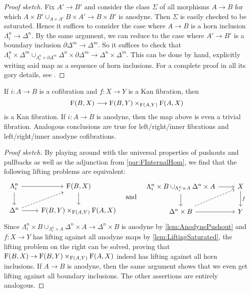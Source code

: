 \begin{proof}[Proof sketch]
	Fix $A'\rightarrow B'$ and consider the class $\Sigma$ of all morphisms $A\rightarrow B$ for which $A\times B'\cup_{A\times A'}B\times A'\rightarrow B\times B'$ is anodyne. Then $\Sigma$ is easily checked to be saturated. Hence it suffices to consider the case where $A\rightarrow B$ is a horn inclusion $\Lambda_i^n\rightarrow \Delta^n$. By the same argument, we can reduce to the case where $A'\rightarrow B'$ is a boundary inclusion $\partial \Delta^m\rightarrow \Delta^m$. So it suffices to check that $\Lambda_i^n\times \Delta^m\cup_{\Lambda_i^n\times \partial\Delta^m}\Delta^n\times \partial\Delta^m\rightarrow \Delta^n\times \Delta^m$. This can be done by hand, explicitly writing said map as a sequence of horn inclusions. For a complete proof in all its gory details, see \cite[Lemma~1.3.31]{Land}.
\end{proof}
\begin{cor}\label{cor:FKanFibration}
	If $i\colon A\rightarrow B$ is a cofibration and $f\colon X\rightarrow Y$ is a Kan fibration, then
	\begin{equation*}
		\operatorname{F}(B,X)\longrightarrow\operatorname{F}(B,Y)\times_{\operatorname{F}(A,Y)}\operatorname{F}(A,X)
	\end{equation*}
	is a Kan fibration. If $i\colon A\rightarrow B$ is anodyne, then the map above is even a trivial fibration. Analogous conclusions are true for left/right/inner fibrations and left/right/inner anodyne cofibrations.
\end{cor}
\begin{proof}[Proof sketch]
	By playing around with the universal properties of pushouts and pullbacks as well as the adjunction from \cref{par:FInternalHom}, we find that the following lifting problems are equivalent:
	\begin{equation*}
		\begin{tikzcd}
			\Lambda_i^n\rar\dar & \F(B,X)\dar\\
			\Delta^n\rar\urar[dashed] & \F(B,Y)\times_{\F(A,Y)}\F(A,X)
		\end{tikzcd}\quad\text{and}\quad
		\begin{tikzcd}
			\Lambda_i^n\times B\cup_{\Lambda_i^n\times A}\Delta^n\times A\rar\dar & X\dar["f"]\\
			\Delta^n\times B\urar[dashed]\rar & Y
		\end{tikzcd}
	\end{equation*}
	Since $\Lambda_i^n\times B\cup_{\Lambda_i^n\times A}\Delta^n\times  A\rightarrow \Delta^n\times B$ is anodyne by \cref{lem:AnodynePushout} and $f\colon X\rightarrow Y$ has lifting against all anodyne maps by \cref{lem:LiftingSaturated}, the lifting problem on the right can be solved, proving that $\operatorname{F}(B,X)\rightarrow \operatorname{F}(B,Y)\times_{\operatorname{F}(A,Y)}\operatorname{F}(A,X)$ indeed has lifting against all horn inclusions. If $A\rightarrow B$ is anodyne, then the same argument shows that we even get lifting against all boundary inclusions. The other assertions are entirely analogous.
\end{proof}
